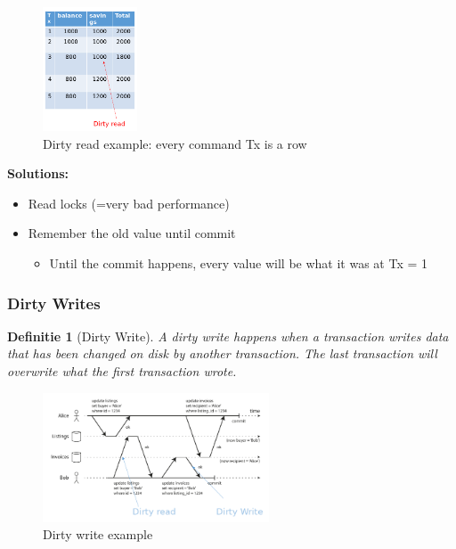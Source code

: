 \documentclass{article}
\newtheorem{theorem}{Definitie}[section]
\begin{document}
\begin{figure}[H]
    \centering
    \includegraphics[width=0.25\textwidth]{dirty-reads.png}
    \caption{Dirty read example: every command Tx is a row}
\end{figure}

 

\textbf{Solutions:}

\begin{itemize}
    \item Read locks (=very bad performance)
    \item Remember the old value until commit
    \begin{itemize}
        \item Until the commit happens, every value will be what it was at Tx = 1
    \end{itemize}
\end{itemize}

\subsubsection{Dirty Writes}

\begin{theorem}[Dirty Write]
A dirty write happens when a transaction writes data that has been changed on disk by another transaction. 
The last transaction will overwrite what the first transaction wrote.
\end{theorem}


\begin{figure}[H]
    \centering
    \includegraphics[width=0.6\textwidth]{dirty-reads-lock.png}
    \caption{Dirty write example}
\end{figure}
\end{document}
